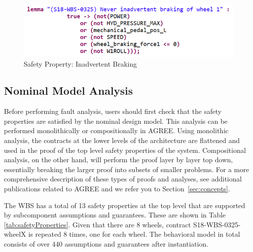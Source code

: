\begin{figure}[htbp]
	\begin{center}
		\includegraphics[width=.7\textwidth]{images/inadvertent_braking.png}
	\end{center}
	\vspace{-0.3in}
	\caption{Safety Property: Inadvertent Braking}
	\label{fig:inadvertent_braking}
\end{figure}

\subsection{Nominal Model Analysis}
Before performing fault analysis, users should first check that the safety properties are satisfied by the nominal design model. This analysis can be performed monolithically or compositionally in AGREE. Using monolithic analysis, the contracts at the lower levels of the architecture are flattened and used in the proof of the top level safety properties of the system. Compositional analysis, on the other hand, will perform the proof layer by layer top down, essentially breaking the larger proof into subsets of smaller problems. For a more comprehensive description of these types of proofs and analyses, see additional publications related to AGREE \cite{cofer2012compositional,QFCS15:backes} and we refer you to Section~\ref{sec:concepts}.

The WBS has a total of 13 safety properties at the top level that are supported by subcomponent assumptions and guarantees. These are shown in Table \ref{tab:safetyProperties}. Given that there are 8 wheels, contract S18-WBS-0325-wheelX is repeated 8 times, one for each wheel. The behavioral model in total consists of over 440 assumptions and guarantees after instantiation.

